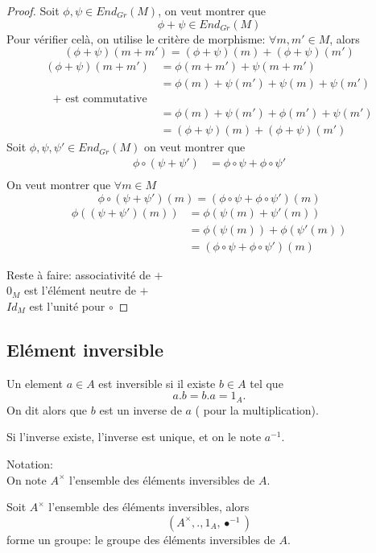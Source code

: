 \documentclass[../main.tex]{subfiles}
\begin{document}
\begin{proof}
	Soit $\phi, \psi \in End_{Gr} ( M)$, on veut montrer que 
	\[ 
		\phi + \psi \in End_{Gr} ( M)
	\]
	Pour vérifier celà, on utilise le critère de morphisme: $\forall m,m' \in M$, alors
	\[ 
		( \phi + \psi)(m+ m') = ( \phi + \psi) ( m) +( \phi + \psi) ( m') 
	\]
	\begin{align*}
		( \phi + \psi)(m + m') &= \phi(m+m') + \psi(m+m')\\
		                 &=\phi(m) + \psi(m') + \psi(m) + \psi(m')\\
				 \text{ $+$ est commutative } \\
				 &= \phi(m) + \psi(m') + \phi(m') + \psi(m')\\
				 &= ( \phi + \psi)(m) + ( \phi+ \psi)(m')
	\end{align*}
	Soit $\phi, \psi, \psi' \in End_{Gr} ( M)$ on veut montrer que
	\begin{align*}
		\phi \circ(\psi + \psi') &= \phi \circ \psi + \phi \circ \psi'\\
	\end{align*}
	On veut montrer que $\forall m \in M$ 
	\[ 
		\phi\circ(\psi + \psi') ( m) = ( \phi\circ \psi + \phi \circ \psi')(m)
	\]
	\begin{align*}
		\phi((\psi+\psi')(m)) &= \phi( \psi(m) + \psi'(m))\\
				      &= \phi(\psi(m)) + \phi(\psi'(m))\\
				      &= ( \phi \circ \psi + \phi \circ \psi')(m)
	\end{align*}
	
	Reste à faire: associativité de $+$ \\
	$0_M$ est l'élément neutre de $+$ \\
	$Id_M$ est l'unité pour $\circ$
\end{proof}
\subsection{Elément inversible}
\begin{defn}\label{defn:element_inversible}
	Un element $a \in A$ est inversible si il existe $b \in A$ tel que
	\[ 
	 a.b = b.a = 1_A.
	\]
	On dit alors que $b$ est un inverse de $a$ ( pour la multiplication).
\end{defn}
\begin{rmq}
Si l'inverse existe, l'inverse est unique, et on le note $a^{-1}$.
\end{rmq}
Notation:\\
On note $A^{\times}$ l'ensemble des éléments inversibles de $A$.
\begin{propo}
Soit $A ^{\times}$ l'ensemble des éléments inversibles, alors
\[ 
	( A^{\times}, . , 1_A, \bullet ^{-1})
\]
forme un groupe: le groupe des éléments inversibles de $A$.
\end{propo}
\end{document}
